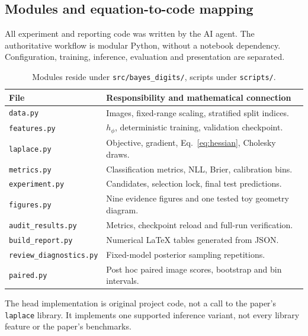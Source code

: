 \documentclass[10pt,a4paper]{article}
\begin{document}
\subsection{Modules and equation-to-code mapping}
All experiment and reporting code was written by the AI agent. The authoritative
workflow is modular Python, without a notebook dependency. Configuration,
training, inference, evaluation and presentation are separated.
\begin{table}[H]\centering\small
\begin{tabularx}{\linewidth}{p{36mm}X}
\toprule File & Responsibility and mathematical connection\\\midrule
\texttt{data.py} & Images, fixed-range scaling, stratified split indices.\\
\texttt{features.py} & $h_\phi$, deterministic training, validation checkpoint.\\
\texttt{laplace.py} & Objective, gradient, Eq.~\ref{eq:hessian}, Cholesky draws.\\
\texttt{metrics.py} & Classification metrics, NLL, Brier, calibration bins.\\
\texttt{experiment.py} & Candidates, selection lock, final test predictions.\\
\texttt{figures.py} & Nine evidence figures and one tested toy geometry diagram.\\
\texttt{audit\_results.py} & Metrics, checkpoint reload and full-run verification.\\
\texttt{build\_report.py} & Numerical LaTeX tables generated from JSON.\\
\texttt{review\_diagnostics.py} & Fixed-model posterior sampling repetitions.\\
\texttt{paired.py} & Post hoc paired image scores, bootstrap and bin intervals.\\
\bottomrule\end{tabularx}
\caption{Modules reside under \texttt{src/bayes\_digits/}, scripts under
\texttt{scripts/}.}
\end{table}
The head implementation is original project code, not a call to the paper's
\texttt{laplace} library. It implements one supported inference variant,
not every library feature or the paper's benchmarks.
\end{document}
